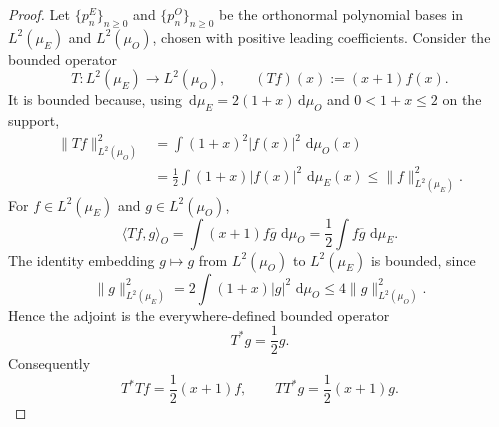 \documentclass[11pt]{amsart}
\numberwithin{equation}{section}
\theoremstyle{plain}
\theoremstyle{definition}
\theoremstyle{remark}
\newcommand{\dd}{\,\mathrm d}
\begin{document}
\begin{proof}
Let $\{p_n^E\}_{n\ge0}$ and $\{p_n^O\}_{n\ge0}$ be the orthonormal polynomial bases in $L^2(\mu_E)$ and $L^2(\mu_O)$, chosen with positive leading coefficients.  Consider the bounded operator
\begin{equation}
T:L^2(\mu_E)\longrightarrow L^2(\mu_O),
\qquad
(Tf)(x):=(x+1)f(x).
\label{eq:Darboux_T_operator}
\end{equation}
It is bounded because, using $\dd\mu_E=2(1+x)\dd\mu_O$ and $0<1+x\le2$ on the support,
\begin{align}
\|Tf\|_{L^2(\mu_O)}^2
&=\int (1+x)^2|f(x)|^2\,\dd\mu_O(x)\\
&=\frac12\int (1+x)|f(x)|^2\,\dd\mu_E(x)
\le\|f\|_{L^2(\mu_E)}^2.
\end{align}
For $f\in L^2(\mu_E)$ and $g\in L^2(\mu_O)$,
\begin{equation}
\langle Tf,g\rangle_{O}
=\int (x+1)f\overline g\,\dd\mu_O
=\frac12\int f\overline g\,\dd\mu_E.
\end{equation}
The identity embedding $g\mapsto g$ from $L^2(\mu_O)$ to $L^2(\mu_E)$ is bounded, since
\begin{equation}
\|g\|_{L^2(\mu_E)}^2
=2\int(1+x)|g|^2\,\dd\mu_O
\le4\|g\|_{L^2(\mu_O)}^2.
\end{equation}
Hence the adjoint is the everywhere-defined bounded operator
\begin{equation}
T^*g=\frac12g.
\label{eq:Darboux_T_adjoint}
\end{equation}
Consequently
\begin{equation}
T^*Tf=\frac12(x+1)f,
\qquad
TT^*g=\frac12(x+1)g.
\label{eq:Darboux_operator_products}
\end{equation}


\end{proof}
\end{document}
